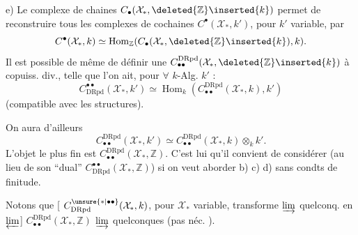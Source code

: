 
e) Le complexe de chaines $C_\bullet(\mathcal X_*,\deleted{\mathbb Z}\inserted{k})$ permet de reconstruire tous les complexes de cochaines $C^\bullet(\mathcal X_*,k')$, pour $k'$  variable, par
\[
C^\bullet(\mathcal X_*,k)\simeq\operatorname{Hom}_{\mathbb Z}(C_\bullet(\mathcal X_*,\deleted{\mathbb Z}\inserted{k}),k).
\]
Il est possible de même de définir une   $C_{\bullet\bullet}^{\mathrm{DRpd}}(\mathcal X_*,\deleted{\mathbb Z}\inserted{k})$  à copuiss. div., telle que l'on ait, pour $\forall$ $k$-Alg. $k'$ :
\[
C^{\bullet\bullet}_{\mathrm{DRpd}}(\mathcal X_*,k')\simeq\operatorname{Hom}_k(C_{\bullet\bullet}^{\mathrm{DRpd}}(\mathcal X_*,k),k')
\]
(compatible avec  les structures).

On aura d'ailleurs
\[
C_{\bullet\bullet}^{\mathrm{DRpd}}(\mathcal X_*,k')\simeq C_{\bullet\bullet}^{\mathrm{DRpd}}(\mathcal X_*,k)\otimes_k k'.
\]
L'objet le plus fin est $C_{\bullet\bullet}^{\mathrm{DRpd}}(\mathcal X_*,\mathbb Z)$. C'est lui qu'il convient de considérer (au lieu de son ``dual'' $C^{\bullet\bullet}_{\mathrm{DRpd}}(\mathcal X_*,\mathbb Z)$) si on veut aborder b) c) d) sans condts de finitude.

Notons que [ $C^{\unsure{*|\bullet\bullet}}_{\mathrm{DRpd}}(\mathcal X_*,k)$, pour $\mathcal X_*$ variable, transforme $\varinjlim$ quelconq. en $\varprojlim$] $C_{\bullet\bullet}^{\mathrm{DRpd}}(\mathcal X_*,\mathbb Z)$   $\varinjlim$ quelconques (pas néc. ).

